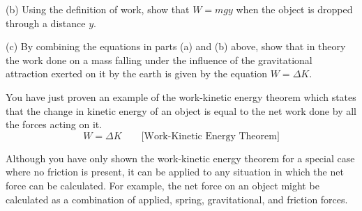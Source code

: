 (b) Using the definition of work, show that $W = mgy$ when the object is dropped
through a distance $y$.
\vspace{20mm}

(c) By combining the equations in parts (a) and (b) above, show that in theory
the work done on a mass falling under the influence of the gravitational attraction
exerted on it by the earth is given by the equation \(W = \Delta  K\).
\vspace{20mm}

You have just proven an example of the work-kinetic energy theorem which 
states that the change in kinetic energy of an object is equal to the net work 
done by all the forces acting on it.
\[
W=\Delta K\qquad \mbox{[Work-Kinetic Energy Theorem]}\]


Although you have only shown the work-kinetic energy theorem for a special 
case where no friction is present, it can be applied to any situation in which 
the net force can be calculated. For example, the net force on an object might 
be calculated as a combination of applied, spring, gravitational, and friction 
forces.

